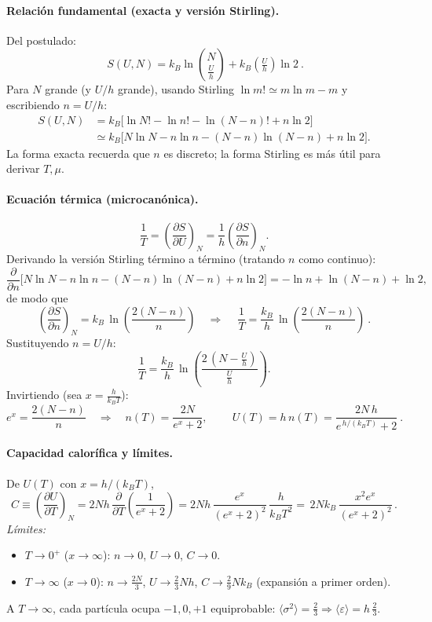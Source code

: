 \documentclass{article}
\begin{document}
\begin{enumerate}[label={{\textcolor{trueblue}{\textbf{Ej}. \arabic*.0}}}, start=4]
\paragraph{Relación fundamental (exacta y versión Stirling).}
Del postulado:
\[
\boxed{\ S(U,N)=k_B\ln\binom{N}{\tfrac{U}{h}}+k_B\left(\tfrac{U}{h}\right)\ln 2\ }.
\]
Para \(N\) grande (y \(U/h\) grande), usando Stirling \(\ln m!\simeq m\ln m-m\) y escribiendo \(n=U/h\):
\begin{equation*}
\begin{split}
S(U,N)
&=k_B\Big[\ln N!-\ln n!-\ln(N-n)!+n\ln 2\Big]\\
&\simeq k_B\Big[N\ln N-n\ln n-(N-n)\ln(N-n)+n\ln 2\Big].
\end{split}
\end{equation*}
La forma exacta recuerda que \(n\) es discreto; la forma Stirling es más útil para derivar \(T,\mu\).

\paragraph{Ecuación térmica (microcanónica).}
\[
\frac{1}{T}=\left(\frac{\partial S}{\partial U}\right)_{N}
=\frac{1}{h}\left(\frac{\partial S}{\partial n}\right)_{N}.
\]
Derivando la versión Stirling término a término (tratando \(n\) como continuo):
\[
\frac{\partial}{\partial n}\Big[N\ln N-n\ln n-(N-n)\ln(N-n)+n\ln2\Big]
=-\ln n+\ln(N-n)+\ln 2,
\]
de modo que
\[
\left(\frac{\partial S}{\partial n}\right)_{N}=k_B\,\ln\!\left(\frac{2(N-n)}{n}\right)
\quad\Longrightarrow\quad
\boxed{\ \frac{1}{T}=\frac{k_B}{h}\,\ln\!\left(\frac{2(N-n)}{n}\right)\ }.
\]
Sustituyendo \(n=U/h\):
\[
\frac{1}{T}=\frac{k_B}{h}\,\ln\!\left(\frac{2\,(N-\tfrac{U}{h})}{\tfrac{U}{h}}\right).
\]
Invirtiendo (sea \(x=\tfrac{h}{k_B T}\)):
\[
e^{x}=\frac{2(N-n)}{n}\quad\Longrightarrow\quad
n(T)=\frac{2N}{e^{x}+2},\qquad
\boxed{\ U(T)=h\,n(T)=\frac{2N\,h}{e^{\,h/(k_B T)}+2}\ }.
\]

\paragraph{Capacidad calorífica y límites.}
De \(U(T)\) con \(x=h/(k_BT)\),
\[
C\equiv\left(\frac{\partial U}{\partial T}\right)_{N}
=2Nh\,\frac{\partial}{\partial T}\!\left(\frac{1}{e^{x}+2}\right)
=2Nh\,\frac{e^{x}}{(e^{x}+2)^2}\,\frac{h}{k_B T^2}
=\boxed{\,2N k_B\,\frac{x^{2}e^{x}}{(e^{x}+2)^{2}}\,}.
\]
\textit{Límites:}
\begin{itemize}
\item \(T\to 0^+\) (\(x\to\infty\)): \(n\to 0\), \(U\to 0\), \(C\to 0\).
\item \(T\to\infty\) (\(x\to 0\)): \(n\to \tfrac{2N}{3}\), \(U\to \tfrac{2}{3}Nh\), \(C\to \tfrac{2}{9}Nk_B\) (expansión a primer orden).
\end{itemize}
A \(T\to\infty\), cada partícula ocupa \(-1,0,+1\) equiprobable: \(\langle \sigma^2\rangle=\tfrac{2}{3}\Rightarrow \langle\varepsilon\rangle=h\,\tfrac{2}{3}\).


\end{enumerate}
\end{document}
